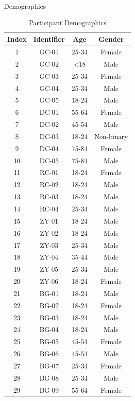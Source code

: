 \documentclass[acmsmall,screen,authorversion,nonacm]{acmart}
\begin{document}
Demographics
\begin{center}
    \begin{table}[H]
    \begin{tabular}{|c|c|c|c|}
    \hline
    Index & Identifier & Age & Gender     \\ \hline
    1     & GC-01      & 25-34  & Female     \\ \hline
    2     & GC-02      & <18  & Male       \\ \hline
    3     & GC-03      & 25-34  & Female     \\ \hline
    4     & GC-04      & 25-34  & Male       \\ \hline
    5     & GC-05      & 18-24  & Male       \\ \hline
    6     & DC-01      & 55-64  & Female     \\ \hline
    7     & DC-02      & 45-54  & Male       \\ \hline
    8     & DC-03      & 18-24  & Non-binary \\ \hline
    9     & DC-04      & 75-84  & Female     \\ \hline
    10    & DC-05      & 75-84  & Male       \\ \hline
    11    & RC-01      & 18-24  & Female     \\ \hline
    12    & RC-02      & 18-24  & Male       \\ \hline
    13    & RC-03      & 18-24  & Male       \\ \hline
    14    & RC-04      & 25-34  & Male       \\ \hline
    15    & ZY-01      & 18-24  & Male       \\ \hline
    16    & ZY-02      & 18-24  & Male       \\ \hline
    17    & ZY-03      & 25-34  & Male       \\ \hline
    18    & ZY-04      & 35-44  & Male       \\ \hline
    19    & ZY-05      & 25-34  & Male       \\ \hline
    20    & ZY-06      & 18-24  & Female     \\ \hline
    21    & BG-01      & 18-24  & Male       \\ \hline
    22    & BG-02      & 18-24  & Female     \\ \hline
    23    & BG-03      & 18-24  & Male       \\ \hline
    24    & BG-04      & 18-24  & Male       \\ \hline
    25    & BG-05      & 45-54  & Female     \\ \hline
    26    & BG-06      & 45-54  & Male       \\ \hline
    27    & BG-07      & 25-34  & Female     \\ \hline
    28    & BG-08      & 25-34  & Male       \\ \hline
    29    & BG-09      & 55-64  & Female     \\ \hline
    \end{tabular}
    \caption{Participant Demographics}
    \end{table}
\end{center}
\end{document}
